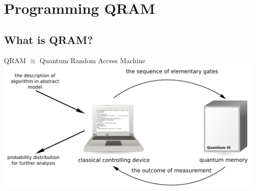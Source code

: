 \documentclass{beamer}
\begin{document}
\section{Programming QRAM}

\begin{frame}
    \begin{center}
    {\color{iitis-orange} \LARGE \insertsection}
    \end{center}
\end{frame}


\subsection{What is QRAM?}
\begin{frame}{\insertsection}{\insertsubsection}
	\begin{center}
	QRAM $\equiv$ Quantum Random Access Machine\\[12pt]
    \includegraphics[width=\textwidth]{pics/qram}
\end{center}
\end{frame}

\end{document}
